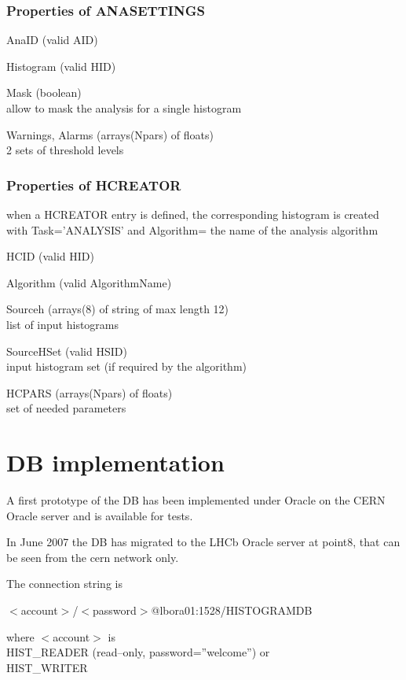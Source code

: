 \documentclass{lhcbnote}
\begin{document}
\subsubsection{Properties of ANASETTINGS}
\begin{description}
\item{AnaID} (valid AID)
\item{Histogram}  (valid HID)
\item{Mask} (boolean)\\
allow to mask the analysis for a single histogram
\item{Warnings, Alarms} (arrays(Npars) of floats)\\
2 sets of threshold levels
\end{description}

\subsubsection{Properties of HCREATOR}
when a HCREATOR entry is defined, the corresponding histogram is
created with Task='ANALYSIS' and Algorithm= the name of the analysis algorithm
\begin{description}
\item{HCID} (valid HID)
\item{Algorithm} (valid AlgorithmName)
\item{Sourceh} (arrays(8) of string of max length 12)\\
list of input histograms
\item{SourceHSet} (valid HSID)\\
input histogram set (if required by the algorithm)
\item{HCPARS} (arrays(Npars) of floats)\\
set of needed parameters 
\end{description}

\section{DB implementation}
A first prototype of the DB has been implemented under Oracle on the
CERN Oracle server and is available for tests.
	
In June 2007 the DB has migrated to the LHCb Oracle server at point8,
that can be seen from the cern network only.

The connection string is \\
\centerline{$<$account$>$/$<$password$>$@lbora01:1528/HISTOGRAMDB}
where $<$account$>$ is \\
{HIST\_READER}   (read--only, password=''welcome'') or \\
{HIST\_WRITER} 
\end{document}
